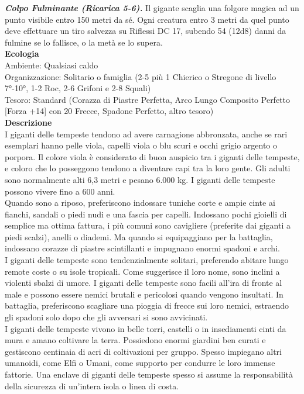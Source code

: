 \begin{multicols}{2}
\emph{\textbf{Colpo Fulminante (Ricarica 5-6).}} Il gigante scaglia una folgore magica ad un punto visibile entro 150 metri da sé. Ogni creatura entro 3 metri da quel punto deve effettuare un tiro salvezza su Riflessi DC 17, subendo 54 (12d8) danni da fulmine se lo fallisce, o la metà se lo supera.\\
\textbf{Ecologia}\\
Ambiente: Qualsiasi caldo\\
Organizzazione: Solitario o famiglia (2-5 più 1 Chierico o Stregone di livello 7°-10°, 1-2 Roc, 2-6 Grifoni e 2-8 Squali)\\
Tesoro: Standard (Corazza di Piastre Perfetta, Arco Lungo Composito Perfetto [Forza +14] con 20 Frecce, Spadone Perfetto, altro tesoro)\\
\textbf{Descrizione}\\
I giganti delle tempeste tendono ad avere carnagione abbronzata, anche se rari esemplari hanno pelle viola, capelli viola o blu scuri e occhi grigio argento o porpora. Il colore viola è considerato di buon auspicio tra i giganti delle tempeste, e coloro che lo posseggono tendono a diventare capi tra la loro gente. Gli adulti sono normalmente alti 6,3 metri e pesano 6.000 kg. I giganti delle tempeste possono vivere fino a 600 anni.\\

Quando sono a riposo, preferiscono indossare tuniche corte e ampie cinte ai fianchi, sandali o piedi nudi e una fascia per capelli. Indossano pochi gioielli di semplice ma ottima fattura, i più comuni sono cavigliere (preferite dai giganti a piedi scalzi), anelli o diademi. Ma quando si equipaggiano per la battaglia, indossano corazze di piastre scintillanti e impugnano enormi spadoni e archi.\\

I giganti delle tempeste sono tendenzialmente solitari, preferendo abitare lungo remote coste o su isole tropicali. Come suggerisce il loro nome, sono inclini a violenti sbalzi di umore. I giganti delle tempeste sono facili all’ira di fronte al male e possono essere nemici brutali e pericolosi quando vengono insultati. In battaglia, preferiscono scagliare una pioggia di frecce sui loro nemici, estraendo gli spadoni solo dopo che gli avversari si sono avvicinati.\\

I giganti delle tempeste vivono in belle torri, castelli o in insediamenti cinti da mura e amano coltivare la terra. Possiedono enormi giardini ben curati e gestiscono centinaia di acri di coltivazioni per gruppo. Spesso impiegano altri umanoidi, come Elfi o Umani, come supporto per condurre le loro immense fattorie. Una enclave di giganti delle tempeste spesso si assume la responsabilità della sicurezza di un’intera isola o linea di costa.\\


\end{multicols}
